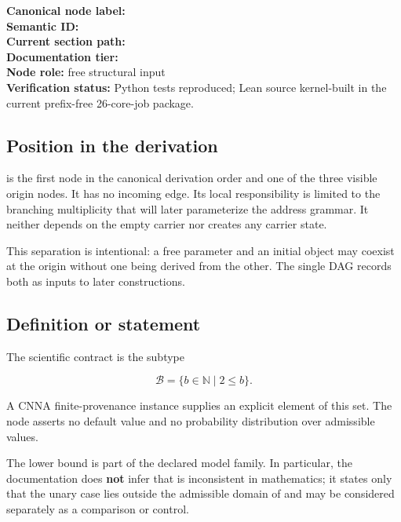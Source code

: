 \textbf{Canonical node label:} \texttt{\protect{}}\\
\textbf{Semantic ID:} \texttt{\protect{}}\\
\textbf{Current section path:} \texttt{\protect{}}\\
\textbf{Documentation tier:} \texttt{\protect{}}\\
\textbf{Node role:} free structural input\\
\textbf{Verification status:} Python tests reproduced; Lean source
kernel-built in the current prefix-free 26-core-job package.

\subsection{Position in the
derivation}\label{position-in-the-derivation}

\texttt{\protect{}} is the first node in the canonical derivation order and
one of the three visible origin nodes. It has no incoming edge. Its
local responsibility is limited to the branching multiplicity that will
later parameterize the address grammar. It neither depends on the empty
carrier \texttt{\protect{}} nor creates any carrier state.

This separation is intentional: a free parameter and an initial object
may coexist at the origin without one being derived from the other. The
single DAG records both as inputs to later constructions.

\subsection{Definition or statement}\label{definition-or-statement}

The scientific contract is the subtype

\[
\mathcal B = \{b\in\mathbb N \mid 2\le b\}.
\]

A CNNA finite-provenance instance supplies an explicit element
\texttt{\protect{}} of this set. The node asserts no default value and no
probability distribution over admissible values.

The lower bound is part of the declared model family. In particular, the
documentation does \textbf{not} infer that \texttt{\protect{}} is
inconsistent in mathematics; it states only that the unary case lies
outside the admissible domain of \texttt{\protect{}} and may be considered
separately as a comparison or control.

